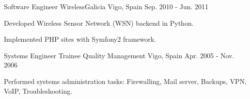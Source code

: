 \begin{cventries}
  \cventry
    {Software Engineer} %
    {WirelessGalicia} %
    {Vigo, Spain} %
    {Sep. 2010 - Jun. 2011} %
    {
      \begin{cvitems} %
        \item {Developed Wireless Sensor Network (WSN) backend in Python.}
        \item {Implemented PHP sites with Symfony2 framework.}
      \end{cvitems} 
    }

  \cventry
    {Systems Engineer Trainee} %
    {Quality Management} %
    {Vigo, Spain} %
    {Apr. 2005 - Nov. 2006} %
    {
      \begin{cvitems} %
        \item {Performed systems administration tasks: Firewalling, Mail server, Backups, VPN, VoIP, Troubleshooting.}
      \end{cvitems}
    }

\end{cventries}
